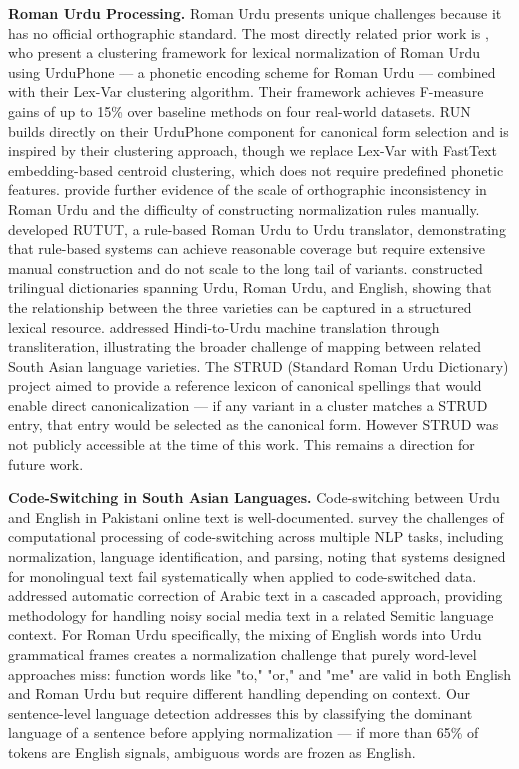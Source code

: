 \documentclass[11pt]{article}
\begin{document}
\textbf{Roman Urdu Processing.} Roman Urdu presents unique challenges because it has no official orthographic standard. The most directly related prior work is \citet{khan2019clustering}, who present a clustering framework for lexical normalization of Roman Urdu using UrduPhone — a phonetic encoding scheme for Roman Urdu — combined with their Lex-Var clustering algorithm. Their framework achieves F-measure gains of up to 15\% over baseline methods on four real-world datasets. RUN builds directly on their UrduPhone component for canonical form selection and is inspired by their clustering approach, though we replace Lex-Var with FastText embedding-based centroid clustering, which does not require predefined phonetic features. \citet{sharf2018lexical} provide further evidence of the scale of orthographic inconsistency in Roman Urdu and the difficulty of constructing normalization rules manually. \citet{shahroz2020rutut} developed RUTUT, a rule-based Roman Urdu to Urdu translator, demonstrating that rule-based systems can achieve reasonable coverage but require extensive manual construction and do not scale to the long tail of variants. \citet{rauf2019trilingual} constructed trilingual dictionaries spanning Urdu, Roman Urdu, and English, showing that the relationship between the three varieties can be captured in a structured lexical resource. \citet{durrani2010hindi} addressed Hindi-to-Urdu machine translation through transliteration, illustrating the broader challenge of mapping between related South Asian language varieties. The STRUD (Standard Roman Urdu Dictionary) \cite{tasadduq2022strud} project aimed to provide a reference lexicon of canonical spellings that would enable direct canonicalization — if any variant in a cluster matches a STRUD entry, that entry would be selected as the canonical form. However STRUD was not publicly accessible at the time of this work. This remains a direction for future work.

\textbf{Code-Switching in South Asian Languages.} Code-switching between Urdu and English in Pakistani online text is well-documented. \citet{cetinoglu2016challenges} survey the challenges of computational processing of code-switching across multiple NLP tasks, including normalization, language identification, and parsing, noting that systems designed for monolingual text fail systematically when applied to code-switched data. \citet{mubarak2014automatic} addressed automatic correction of Arabic text in a cascaded approach, providing methodology for handling noisy social media text in a related Semitic language context. For Roman Urdu specifically, the mixing of English words into Urdu grammatical frames creates a normalization challenge that purely word-level approaches miss: function words like "to," "or," and "me" are valid in both English and Roman Urdu but require different handling depending on context. Our sentence-level language detection addresses this by classifying the dominant language of a sentence before applying normalization — if more than 65\% of tokens are English signals, ambiguous words are frozen as English.
\end{document}
